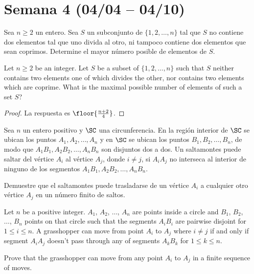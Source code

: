 \section{Semana 4 (04/04 -- 04/10)}


\begin{probMR}[Balkan MO 2005/4]
	Sea $n\ge 2$ un entero. Sea $S$ un subconjunto de $\{1,2,\dots,n\}$ tal que $S$ no contiene dos elementos tal que uno divida al otro, ni tampoco contiene dos elementos que sean coprimos. Determine el mayor número posible de elementos de $S$.
	\begin{hint}
		Let $n\ge 2$ be an integer. Let $S$ be a subset of $\{1,2,\dots,n\}$ such that $S$ neither contains two elements one of which divides the other, nor contains two elements which are coprime. What is the maximal possible number of elements of such a set $S$?
	\end{hint}
\end{probMR}

\begin{proof}
	La respuesta es $\floor{\frac{n+2}{4}}$.
\end{proof}

\begin{probMB}[Croatian MO 2018/5]
	Sea $n$ un entero positivo y $\SC$ una circunferencia. En la región interior de $\SC$ se ubican los puntos $A_1,A_2,\dots,A_n$ y en $\SC$ se ubican los puntos $B_1,B_2,\dots,B_n$, de modo que $A_1B_1,A_2B_2,\dots,A_nB_n$ son disjuntos dos a dos. Un saltamontes puede saltar del vértice $A_i$ al vértice $A_j$, donde $i\ne j$, si $A_iA_j$ no interseca al interior de ninguno de los segmentos $A_1B_1,A_2B_2,\dots,A_nB_n$.

	Demuestre que el saltamontes puede trasladarse de un vértice $A_i$ a cualquier otro vértice $A_j$ en un número finito de saltos.
	\begin{hint}
		Let $n$ be a positive integer. $A_1$, $A_2$, $\dots$, $A_n$ are points inside a circle and $B_1$, $B_2$, $\dots$, $B_n$ points on that circle such that the segments $A_iB_i$ are pairwise disjoint for $1\le i\le n$. A grasshopper can move from point $A_i$ to $A_j$ where $i\ne j$ if and only if segment $A_iA_j$ doesn't pass through any of segments $A_kB_k$ for $1\le k\le n$.

		Prove that the grasshopper can move from any point $A_i$ to $A_j$ in a finite sequence of moves.
	\end{hint}
\end{probMB}

